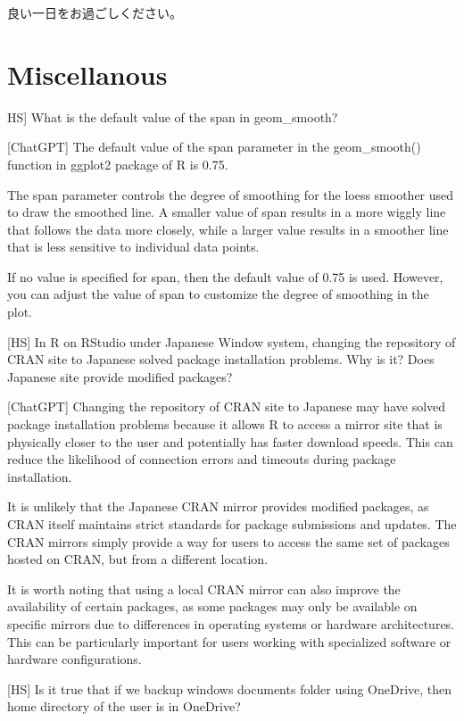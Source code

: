 \documentclass[
]{book}
\theoremstyle{definition}
\theoremstyle{definition}
\theoremstyle{definition}
\theoremstyle{definition}
\theoremstyle{remark}
\begin{document}
良い一日をお過ごしください。

\hypertarget{miscellanous}{%
\section{Miscellanous}\label{miscellanous}}

HS{]} What is the default value of the span in geom\_smooth?

{[}ChatGPT{]} The default value of the span parameter in the geom\_smooth() function in ggplot2 package of R is 0.75.

The span parameter controls the degree of smoothing for the loess smoother used to draw the smoothed line. A smaller value of span results in a more wiggly line that follows the data more closely, while a larger value results in a smoother line that is less sensitive to individual data points.

If no value is specified for span, then the default value of 0.75 is used. However, you can adjust the value of span to customize the degree of smoothing in the plot.

{[}HS{]} In R on RStudio under Japanese Window system, changing the repository of CRAN site to Japanese solved package installation problems. Why is it? Does Japanese site provide modified packages?

{[}ChatGPT{]} Changing the repository of CRAN site to Japanese may have solved package installation problems because it allows R to access a mirror site that is physically closer to the user and potentially has faster download speeds. This can reduce the likelihood of connection errors and timeouts during package installation.

It is unlikely that the Japanese CRAN mirror provides modified packages, as CRAN itself maintains strict standards for package submissions and updates. The CRAN mirrors simply provide a way for users to access the same set of packages hosted on CRAN, but from a different location.

It is worth noting that using a local CRAN mirror can also improve the availability of certain packages, as some packages may only be available on specific mirrors due to differences in operating systems or hardware architectures. This can be particularly important for users working with specialized software or hardware configurations.

{[}HS{]} Is it true that if we backup windows documents folder using OneDrive, then home directory of the user is in OneDrive?
\end{document}
